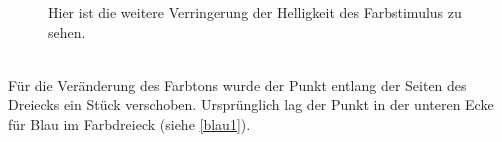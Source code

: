 \documentclass[11pt]{article}
\begin{document}
{\begin{minipage}[t]{0.6\textwidth}
\begin{figure}[H]
\caption{Hier ist die weitere Verringerung der Helligkeit des Farbstimulus zu sehen. }
\label{blau3}
\end{figure}
\end{minipage}} \\

Für die Veränderung des Farbtons wurde der Punkt entlang der Seiten des Dreiecks ein Stück verschoben. Ursprünglich lag der Punkt in der unteren Ecke für Blau im Farbdreieck (siehe \ref{blau1}).
\end{document}
